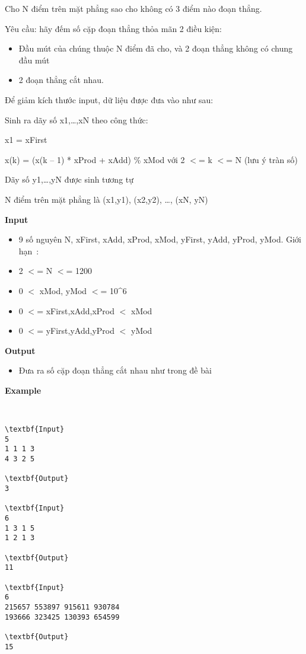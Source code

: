

Cho N điểm trên mặt phẳng sao cho không có 3 điểm nào đoạn thẳng.

Yêu cầu: hãy đếm số cặp đoạn thẳng thỏa mãn 2 điều kiện:
\begin{itemize}
	\item 

Đầu mút của chúng thuộc N điểm đã cho, và 2 đoạn thẳng không có chung đầu mút
	\item 

2 đoạn thẳng cắt nhau.
\end{itemize}

Để giảm kích thước input, dữ liệu được đưa vào như sau:

Sinh ra dãy số x1,…,xN theo công thức:

x1 = xFirst

x(k) = (x(k – 1) * xProd + xAdd) \% xMod với 2 $<$= k $<$= N (lưu ý tràn số)

Dãy số y1,…,yN được sinh tương tự

N điểm trên mặt phẳng là (x1,y1), (x2,y2), …, (xN, yN)

\textbf{Input}
\begin{itemize}
	\item 

9 số nguyên N, xFirst, xAdd, xProd, xMod, yFirst, yAdd, yProd, yMod. Giới hạn :
	\item 

2 $<$= N $<$= 1200
	\item 

0 $<$ xMod, yMod $<$= 10\textasciicircum6
	\item 

0 $<$= xFirst,xAdd,xProd $<$ xMod
	\item 

0 $<$= yFirst,yAdd,yProd $<$ yMod
\end{itemize}

\textbf{Output}
\begin{itemize}
	\item 

Đưa ra số cặp đoạn thẳng cắt nhau như trong đề bài
\end{itemize}

\textbf{Example}

 
\begin{verbatim}
\textbf{Input}
5
1 1 1 3
4 3 2 5

\textbf{Output}
3

\textbf{Input}
6
1 3 1 5
1 2 1 3

\textbf{Output}
11

\textbf{Input}
6
215657 553897 915611 930784
193666 323425 130393 654599

\textbf{Output}
15\end{verbatim}